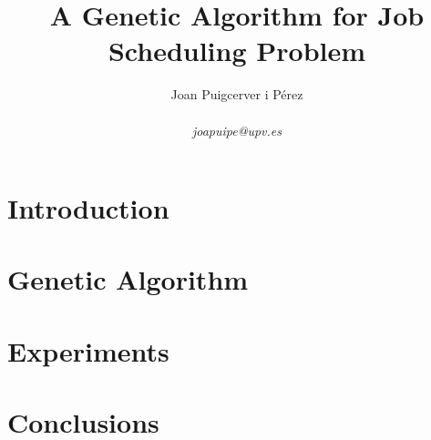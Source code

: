 \documentclass[10pt,a4paper]{article}
\author{Joan Puigcerver i Pérez\\
\begin{footnotesize}
\textit{joapuipe@upv.es}
\end{footnotesize}}
\title{A Genetic Algorithm for Job Scheduling Problem}
\begin{document}
\maketitle
\section{Introduction}
\section{Genetic Algorithm}
\section{Experiments}
\section{Conclusions}
\end{document}
